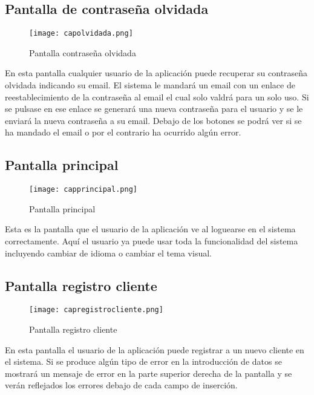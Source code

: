 \subsection {Pantalla de contraseña olvidada}

\begin{figure}[!htb]
  \centering
    \texttt{[image: capolvidada.png]}
  \caption{Pantalla contraseña olvidada}
  \label{a}
\end{figure}

En esta pantalla cualquier usuario de la aplicación puede recuperar su contraseña olvidada indicando su email. El sistema le mandará un email con un enlace de reestablecimiento de la contraseña al email el cual solo valdrá para un solo uso. Si se pulsase en ese enlace se generará una nueva contraseña para el usuario y se le enviará la nueva contraseña a su email. Debajo de los botones se podrá ver si se ha mandado el email o por el contrario ha ocurrido algún error.

\newpage
\subsection {Pantalla principal}

\begin{figure}[!htb]
  \centering
    \texttt{[image: capprincipal.png]}
  \caption{Pantalla principal}
  \label{a}
\end{figure}

Esta es la pantalla que el usuario de la aplicación ve al loguearse en el sistema correctamente. Aquí el usuario ya puede usar toda la funcionalidad del sistema incluyendo cambiar de idioma o cambiar el tema visual.

\subsection {Pantalla registro cliente}

\begin{figure}[!htb]
  \centering
    \texttt{[image: capregistrocliente.png]}
  \caption{Pantalla registro cliente}
  \label{a}
\end{figure}

En esta pantalla el usuario de la aplicación puede registrar a un nuevo cliente en el sistema. Si se produce algún tipo de error en la introducción de datos se mostrará un mensaje de error en la parte superior derecha de la pantalla y se verán reflejados los errores debajo de cada campo de inserción.

